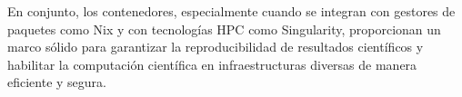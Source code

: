 En conjunto, los contenedores, especialmente cuando se integran con gestores de paquetes como Nix y con tecnologías HPC como Singularity, proporcionan un marco sólido para garantizar la reproducibilidad de resultados científicos y habilitar la computación científica en infraestructuras diversas de manera eficiente y segura.





